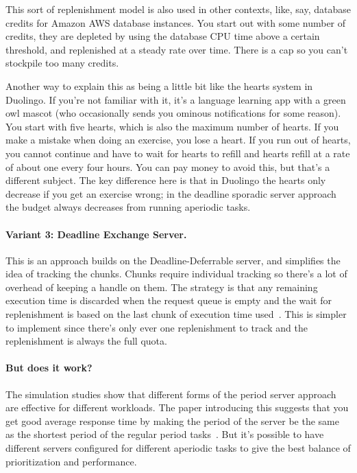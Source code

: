 This sort of replenishment model is also used in other contexts, like, say, database credits for Amazon AWS database instances. You start out with some number of credits, they are depleted by using the database CPU time above a certain threshold, and replenished at a steady rate over time. There is a cap  so you can't stockpile too many credits. 

Another way to explain this as being a little bit like the hearts system in Duolingo. If you're not familiar with it, it's a language learning app with a green owl mascot (who occasionally sends you ominous notifications for some reason). You start with five hearts, which is also the maximum number of hearts. If you make a mistake when doing an exercise, you lose a heart. If you run out of hearts, you cannot continue and have to wait for hearts to refill and hearts refill at a rate of about one every four hours. You can pay money to avoid this, but that's a different subject. The key difference here is that in Duolingo the hearts only decrease if you get an exercise wrong; in the deadline sporadic server approach the budget always decreases from running aperiodic tasks.

\paragraph{Variant 3: Deadline Exchange Server.}
This is an approach builds on the Deadline-Deferrable server, and simplifies the idea of tracking the chunks. Chunks require individual tracking so there's a lot of overhead of keeping a handle on them. The strategy is that any remaining execution time is discarded when the request queue is empty and the wait for replenishment is based on the last chunk of execution time used~\cite{aperiodic-server}. This is simpler to implement since there's only ever one replenishment to track and the replenishment is always the full quota. 

\paragraph{But does it work?}
The simulation studies show that different forms of the period server approach are effective for different workloads. The paper introducing this suggests that you get good average response time by making the period of the server be the same as the shortest period of the regular period tasks~\cite{aperiodic-server}. But it's possible to have different servers configured for different aperiodic tasks to give the best balance of prioritization and performance.


